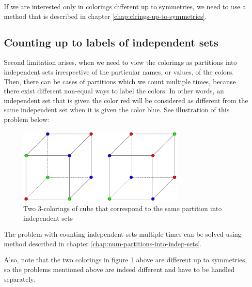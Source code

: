 \begin{highlight}
If we are interested only in colorings different up to symmetries, we need to use a method that is described in chapter \ref{chap:clrings-up-to-symmetries}.

\subsection{Counting up to labels of independent sets}

Second limitation arises, when we need to view the colorings as partitions into independent sets irrespective of the particular names, or values, of the colors. Then, there can be cases of partitions which we count multiple times, because there exist different non-equal ways to label the colors. In other words, an independent set that is given the color red will be considered as different from the same independent set when it is given the color blue. See illustration of this problem below:

\begin{figure}[H]
    \centering
    \includegraphics[width=0.75\textwidth]{Resources/Figs/cube_relabelings_problem.pdf}
    \caption{Two 3-colorings of cube that correspond to the same partition into independent sets}
    \label{fig:cube-clrings-same-partition}
\end{figure}

The problem with counting independent sets multiple times can be solved using method described in chapter \ref{chap:num-partitions-into-indep-sets}. 

Also, note that the two colorings in figure \ref{fig:cube-clrings-same-partition} above are different up to symmetries, so the problems mentioned above are indeed different and have to be handled separately.

\end{highlight}
